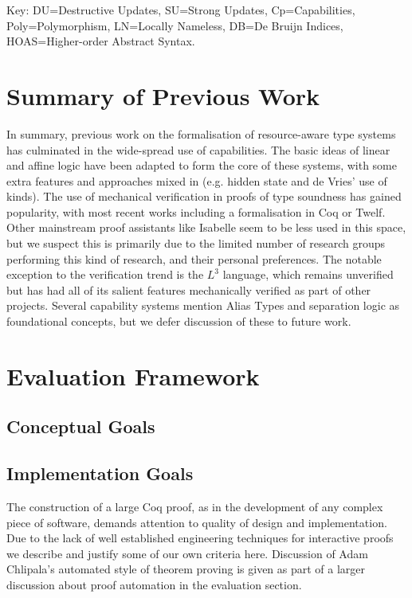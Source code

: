 \documentclass[]{unswthesis}
\begin{document}
Key: DU=Destructive Updates, SU=Strong Updates, Cp=Capabilities, Poly=Polymorphism, LN=Locally Nameless, DB=De Bruijn Indices, HOAS=Higher-order Abstract Syntax.

\section{Summary of Previous Work}

In summary, previous work on the formalisation of resource-aware type systems has culminated in the wide-spread use of capabilities. The basic ideas of linear and affine logic have been adapted to form the core of these systems, with some extra features and approaches mixed in (e.g. hidden state and de Vries' use of kinds). The use of mechanical verification in proofs of type soundness has gained popularity, with most recent works including a formalisation in Coq or Twelf. Other mainstream proof assistants like Isabelle seem to be less used in this space, but we suspect this is primarily due to the limited number of research groups performing this kind of research, and their personal preferences. The notable exception to the verification trend is the $L^3$ language, which remains unverified but has had all of its salient features mechanically verified as part of other projects. Several capability systems mention Alias Types \cite{smith00} and separation logic \cite{reynolds02} as foundational concepts, but we defer discussion of these to future work.

\section{Evaluation Framework}

\subsection{Conceptual Goals}

\subsection{Implementation Goals}

The construction of a large Coq proof, as in the development of any complex piece of software, demands attention to quality of design and implementation. Due to the lack of well established engineering techniques for interactive proofs we describe and justify some of our own criteria here. Discussion of Adam Chlipala's automated style of theorem proving is given as part of a larger discussion about proof automation in the evaluation section.
\end{document}

